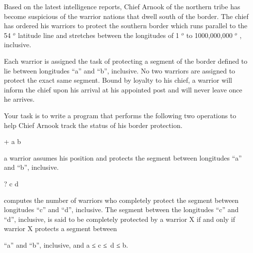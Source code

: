 Based on the latest intelligence reports, Chief Arnook of the northern tribe has become suspicious of the warrior nations that dwell south of the border. The chief has ordered his warriors to protect the southern border which runs parallel to the 54     $^      o     $     latitude line and stretches between the longitudes of 1     $^      o     $     to 1000,000,000     $^      o     $     , inclusive.    

     Each warrior is assigned the task of protecting a segment of the border defined to lie between longitudes “a” and “b”, inclusive. No two warriors are assigned to protect the exact same segment. Bound by loyalty to his chief, a warrior will inform the chief upon his arrival at his appointed post and will never leave once he arrives.    

         Your task is to write a program that performs the following two operations                   to help Chief Arnook track the status of his border protection.         



        + a b       

        a warrior assumes his position and protects the segment between longitudes “a” and “b”, inclusive.       



        ? c d       

           computes the number of warriors who completely protect the segment between longitudes “c” and “d”, inclusive. The segment between the longitudes “c” and “d”, inclusive, is said to be completely protected by a warrior X if and only if warrior X protects a segment between          

            “a” and “b”, inclusive, and a ≤ c ≤ d ≤ b.            
\\


\\